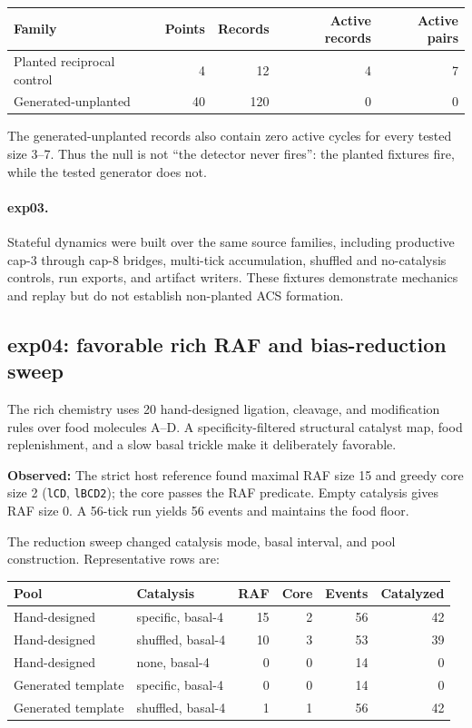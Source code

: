 \documentclass[11pt]{article}
\newcommand{\code}[1]{\texttt{#1}}
\newcommand{\obs}{\textbf{Observed: }}
\begin{document}
\begin{center}
\begin{tabular}{lrrrr}
\toprule
Family & Points & Records & Active records & Active pairs \\
\midrule
Planted reciprocal control & 4 & 12 & 4 & 7 \\
Generated-unplanted & 40 & 120 & 0 & 0 \\
\bottomrule
\end{tabular}
\end{center}

The generated-unplanted records also contain zero active cycles for every
tested size 3--7.  Thus the null is not ``the detector never fires'': the
planted fixtures fire, while the tested generator does not.

\paragraph{exp03.}
Stateful dynamics were built over the same source families, including
productive cap-3 through cap-8 bridges, multi-tick accumulation, shuffled and
no-catalysis controls, run exports, and artifact writers.  These fixtures
demonstrate mechanics and replay but do not establish non-planted ACS
formation.

\subsection{exp04: favorable rich RAF and bias-reduction sweep}

The rich chemistry uses 20 hand-designed ligation, cleavage, and modification
rules over food molecules A--D.  A specificity-filtered structural catalyst
map, food replenishment, and a slow basal trickle make it deliberately
favorable.

\obs The strict host reference found maximal RAF size 15 and greedy core size
2 (\code{lCD}, \code{lBCD2}); the core passes the RAF predicate.  Empty
catalysis gives RAF size 0.  A 56-tick run yields 56 events and maintains the
food floor.

The reduction sweep changed catalysis mode, basal interval, and pool
construction.  Representative rows are:

\begin{center}
\begin{tabular}{llrrrr}
\toprule
Pool & Catalysis & RAF & Core & Events & Catalyzed \\
\midrule
Hand-designed & specific, basal-4 & 15 & 2 & 56 & 42 \\
Hand-designed & shuffled, basal-4 & 10 & 3 & 53 & 39 \\
Hand-designed & none, basal-4 & 0 & 0 & 14 & 0 \\
Generated template & specific, basal-4 & 0 & 0 & 14 & 0 \\
Generated template & shuffled, basal-4 & 1 & 1 & 56 & 42 \\
\bottomrule
\end{tabular}
\end{center}
\end{document}
